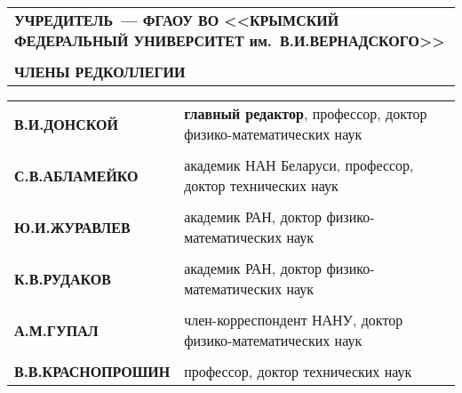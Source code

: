 \def\baselinestretch{1}
\thispagestyle{empty}

\myinter=2pt

\parindent=0mm
{\scriptsize\sf
    \renewcommand{\arraystretch}{0}
    \begin{tabular}{l}
        \textbf{УЧРЕДИТЕЛЬ~--- ФГАОУ ВО <<КРЫМСКИЙ ФЕДЕРАЛЬНЫЙ УНИВЕРСИТЕТ им.~В.\;И.\;ВЕРНАДСКОГО>>}\\
        
        \rule{0pt}{0.6cm}\\%
        \textbf{ЧЛЕНЫ РЕДКОЛЛЕГИИ}\\
    \end{tabular}
}

\vspace{0.3cm} {\renewcommand{\arraystretch}{0.4}
\begin{tabular}{ll}
{\qquad\scriptsize\sf \textbf{В.\;И.\;ДОНСКОЙ}}        & {\scriptsize\sf \textbf{главный редактор}, профессор, доктор физико-математических наук}\\

\rule{0pt}{4pt} & \\
{\qquad\scriptsize\sf \textbf{С.\;В.\;АБЛАМЕЙКО}}   & {\scriptsize\sf академик НАН Беларуси, профессор, доктор технических наук}\\

\rule{0pt}{4pt} & \\
{\qquad\scriptsize\sf \textbf{Ю.\;И.\;ЖУРАВЛЕВ}}       & {\scriptsize\sf академик РАН, доктор физико-математических наук}\\

\rule{0pt}{4pt} & \\
{\qquad\scriptsize\sf \textbf{К.\;В.\;РУДАКОВ}}        & {\scriptsize\sf академик РАН, доктор физико-математических наук}\\

\rule{0pt}{4pt} & \\
{\qquad\scriptsize\sf \textbf{А.\;М.\;ГУПАЛ}}          & {\scriptsize\sf член-корреспондент НАНУ, доктор физико-математических наук}\\

\rule{0pt}{4pt} & \\
{\qquad\scriptsize\sf \textbf{В.\;В.\;КРАСНОПРОШИН}}   & {\scriptsize\sf профессор, доктор технических наук}\\


\end{tabular}}
